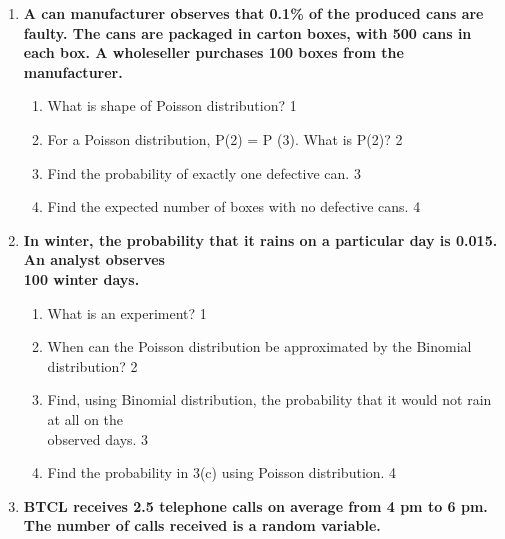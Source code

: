 \documentclass[a4paper,oneside, margin=1.4in]{book}
\begin{document}
\begin{enumerate}
  \begin{enumerate}
    \item
	What is another way to write $P(X \ge 1)$? \hfill 1
    \item
	Can the mean of Poisson distribution be negative? \hfill 2
    \item  
	From the given stem, find mean and variance. \hfill 3
    \item
	Find the expected frequencies and comment. \hfill 4
  \end{enumerate}
  
 \item
	  \textbf{A can manufacturer observes that 0.1\% of the produced cans are faulty. The cans are packaged in carton boxes, with 500 cans in each box. A wholeseller purchases 100 boxes from the manufacturer.} 
  
  \begin{enumerate}
    \item
	What is shape of Poisson distribution? \hfill 1
    \item
	For a Poisson distribution, P(2) = P (3). What is P(2)? \hfill 2
    \item  
	Find the probability of exactly one defective can. \hfill 3
    \item
	Find the expected number of boxes with no defective cans. \hfill 4
  \end{enumerate}
  
  \item
  \textbf{In winter, the probability that it rains on a particular day is 0.015. An analyst observes \\ 100 winter days.}
 
  \begin{enumerate}
    \item
	What is an experiment? \hfill 1
    \item
    	When can the Poisson distribution be approximated by the Binomial distribution? \hfill 2
    \item
    	Find, using Binomial distribution, the probability that  it would not rain at all on the \\ observed days. \hfill 3
     \item
     	Find the probability in 3(c) using Poisson distribution.  \hfill 4
  \end{enumerate}

  \item
	  \textbf{BTCL receives 2.5 telephone calls on average from 4 pm to 6 pm. The number of calls received is a random variable. } 
  

\end{enumerate}
\end{document}

